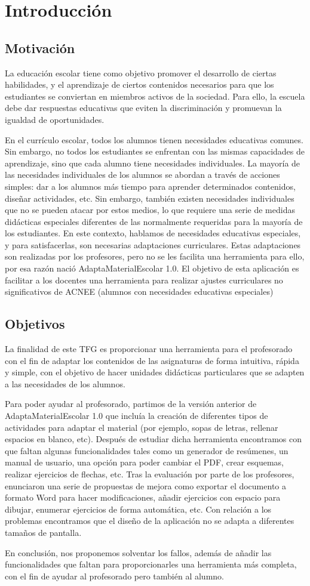\chapter{Introducción}
\label{cap:introduccion}

\section{Motivación}
La educación escolar tiene como objetivo promover el desarrollo de ciertas habilidades, y el aprendizaje de ciertos contenidos necesarios para que los estudiantes se conviertan en miembros activos de la sociedad. Para ello, la escuela debe dar respuestas educativas que eviten la discriminación y promuevan la igualdad de oportunidades.

En el currículo escolar, todos los alumnos tienen necesidades educativas comunes. Sin embargo, no todos los estudiantes se enfrentan con las mismas capacidades de aprendizaje, sino que cada alumno tiene necesidades individuales. La mayoría de las necesidades individuales de los alumnos se abordan a través de acciones simples: dar a los alumnos más tiempo para aprender determinados contenidos, diseñar actividades, etc.  Sin embargo, también existen necesidades individuales que no se pueden atacar por estos medios, lo que requiere una serie de medidas didácticas especiales diferentes de las normalmente requeridas para la mayoría de los estudiantes. En este contexto, hablamos de necesidades educativas especiales, y para satisfacerlas, son necesarias adaptaciones curriculares.  Estas adaptaciones son realizadas por los profesores, pero no se les facilita una herramienta para ello, por esa razón nació AdaptaMaterialEscolar 1.0. El objetivo de esta aplicación es facilitar a los docentes una herramienta para realizar ajustes curriculares no significativos de ACNEE (alumnos con necesidades educativas especiales)

\section{Objetivos}
La finalidad de este TFG es proporcionar una herramienta para el profesorado con el fin de adaptar los contenidos de las asignaturas de forma intuitiva, rápida y simple, con el objetivo de hacer unidades didácticas particulares que se adapten a las necesidades de los alumnos.

Para poder ayudar al profesorado, partimos de la versión anterior de AdaptaMaterialEscolar 1.0 que incluía la creación de diferentes tipos de actividades para adaptar el material (por ejemplo, sopas de letras, rellenar espacios en blanco, etc). Después de estudiar dicha herramienta encontramos con que faltan algunas funcionalidades tales como un generador de resúmenes, un manual de usuario, una opción para poder cambiar el PDF, crear esquemas, realizar ejercicios de flechas, etc. Tras la evaluación por parte de los profesores, enunciaron una serie de propuestas de mejora como exportar el documento a formato Word para hacer modificaciones, añadir ejercicios con espacio para dibujar, enumerar ejercicios de forma automática, etc. Con relación a los problemas encontramos que el diseño de la aplicación no se adapta a diferentes tamaños de pantalla. 

En conclusión, nos proponemos solventar los fallos, además de añadir las funcionalidades que faltan para proporcionarles una herramienta más completa, con el fin de ayudar al profesorado pero también al alumno. 

